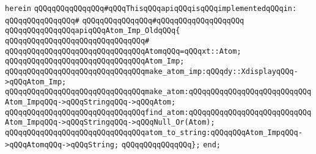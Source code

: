 \verb|herein|\newline
\newline
\verb|qQQqqQQqqQQqqQQq#qQQqThisqQQqapiqQQqisqQQqimplementedqQQqin:|\newline
\verb|qQQqqQQqqQQqqQQq#|\newline
\verb|qQQqqQQqqQQqqQQq#qQQqqQQqqQQqqQQqqQQq|\newline
\newline
\verb|qQQqqQQqqQQqqQQqapiqQQqAtom_Imp_OldqQQq{|\newline
\verb|qQQqqQQqqQQqqQQqqQQqqQQqqQQqqQQq#|\newline
\verb|qQQqqQQqqQQqqQQqqQQqqQQqqQQqqQQqAtomqQQq=qQQqxt::Atom;|\newline
\newline
\verb|qQQqqQQqqQQqqQQqqQQqqQQqqQQqqQQqAtom_Imp;|\newline
\newline
\verb|qQQqqQQqqQQqqQQqqQQqqQQqqQQqqQQqmake_atom_imp:qQQqdy::XdisplayqQQq->qQQqAtom_Imp;|\newline
\newline
\verb|qQQqqQQqqQQqqQQqqQQqqQQqqQQqqQQqmake_atom:qQQqqQQqqQQqqQQqqQQqqQQqqQQqAtom_ImpqQQq->qQQqStringqQQq->qQQqAtom;|\newline
\verb|qQQqqQQqqQQqqQQqqQQqqQQqqQQqqQQqfind_atom:qQQqqQQqqQQqqQQqqQQqqQQqqQQqAtom_ImpqQQq->qQQqStringqQQq->qQQqNull_Or(Atom);|\newline
\verb|qQQqqQQqqQQqqQQqqQQqqQQqqQQqqQQqatom_to_string:qQQqqQQqAtom_ImpqQQq->qQQqAtomqQQq->qQQqString;|\newline
\verb|qQQqqQQqqQQqqQQq};|\newline
\newline
\verb|end;|\newline
\newline
\newline

